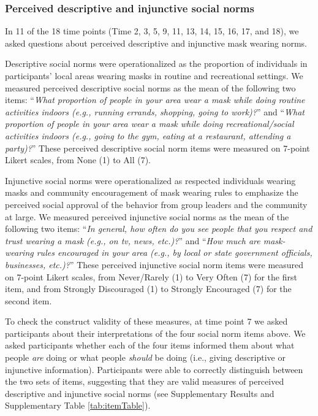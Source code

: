 \documentclass[
  man, donotrepeattitle,floatsintext]{apa6}
\begin{document}
\hypertarget{perceived-descriptive-and-injunctive-social-norms}{%
\subsubsection{Perceived descriptive and injunctive social norms}\label{perceived-descriptive-and-injunctive-social-norms}}

In 11 of the 18 time points (Time 2, 3, 5, 9, 11, 13, 14, 15, 16, 17, and 18), we asked questions about perceived descriptive and injunctive mask wearing norms.

Descriptive social norms were operationalized as the proportion of individuals in participants' local areas wearing masks in routine and recreational settings. We measured perceived descriptive social norms as the mean of the following two items: ``\emph{What proportion of people in your area wear a mask while doing routine activities indoors (e.g., running errands, shopping, going to work)?}'' and ``\emph{What proportion of people in your area wear a mask while doing recreational/social activities indoors (e.g., going to the gym, eating at a restaurant, attending a party)?}'' These perceived descriptive social norm items were measured on 7-point Likert scales, from None (1) to All (7).

Injunctive social norms were operationalized as respected individuals wearing masks and community encouragement of mask wearing rules to emphasize the perceived social approval of the behavior from group leaders and the community at large. We measured perceived injunctive social norms as the mean of the following two items: ``\emph{In general, how often do you see people that you respect and trust wearing a mask (e.g., on tv, news, etc.)?}'' and ``\emph{How much are mask-wearing rules encouraged in your area (e.g., by local or state government officials, businesses, etc.)?}'' These perceived injunctive social norm items were measured on 7-point Likert scales, from Never/Rarely (1) to Very Often (7) for the first item, and from Strongly Discouraged (1) to Strongly Encouraged (7) for the second item.

To check the construct validity of these measures, at time point 7 we asked participants about their interpretations of the four social norm items above. We asked participants whether each of the four items informed them about what people \emph{are} doing or what people \emph{should} be doing (i.e., giving descriptive or injunctive information). Participants were able to correctly distinguish between the two sets of items, suggesting that they are valid measures of perceived descriptive and injunctive social norms (see Supplementary Results and Supplementary Table \ref{tab:itemTable}).
\end{document}

